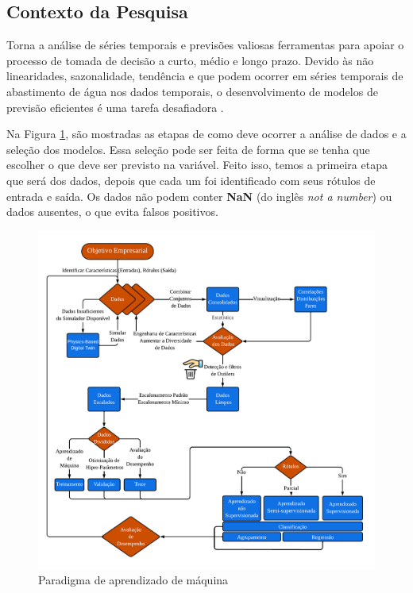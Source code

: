 \subsection{Contexto da Pesquisa} \label{subsec:contexto}
Torna a análise de séries temporais e previsões valiosas ferramentas para apoiar o processo de tomada de decisão a curto, médio e longo prazo. Devido às não linearidades, sazonalidade, tendência e que podem ocorrer em séries temporais de abastimento de água nos dados temporais, o desenvolvimento de modelos de previsão eficientes é uma tarefa desafiadora \cite{mateus}.

Na Figura \ref{fig:paradigma-ml}, são mostradas as etapas de como deve ocorrer a análise de dados e a seleção dos modelos. Essa seleção pode ser feita de forma que se tenha que escolher o que deve ser previsto na variável. Feito isso, temos a primeira etapa que será dos dados, depois que cada um foi identificado com seus rótulos de entrada e saída. Os dados não podem conter \textbf{NaN} (do inglês \textit{not a number}) ou dados ausentes, o que evita falsos positivos. 

\begin{figure}[!htb]
	\centering
	\caption{Paradigma de aprendizado de máquina}
	\includegraphics[width=\linewidth]{Introducao/Figuras/paradigma-ml}
	
	\label{fig:paradigma-ml}
\end{figure}

